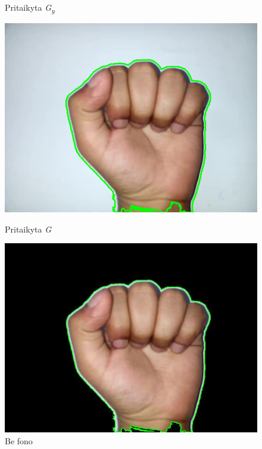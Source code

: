 \documentclass{VUMIFInfKursinis}
\begin{document}
\begin{figure}[H]
\begin{minipage}{.3\textwidth}
		\caption{Pritaikyta \textit{G\textsubscript{y}}}
		\label{img:a-sobelY}
	\end{minipage}\hspace{\fill}%
	\begin{minipage}{.3\textwidth}
		\centering
		\includegraphics[width=.8\linewidth]{img/A-sobel}
		\caption{Pritaikyta \textit{G}}
		\label{img:a-sobel}
	\end{minipage}\hspace{\fill}%
	\begin{minipage}{.3\textwidth}
		\centering
		\includegraphics[width=.8\linewidth]{img/A-black}
		\caption{Be fono}
		\label{img:a-black-sign}
	\end{minipage}\hspace{\fill}%

\end{figure}
\end{document}
